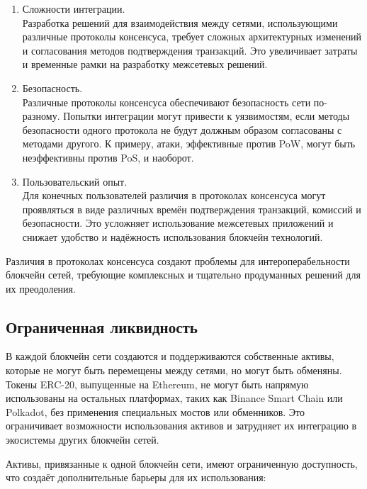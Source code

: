 \begin{enumerate}
	\item Сложности интеграции.\\
	Разработка решений для взаимодействия между сетями, использующими различные протоколы консенсуса, требует сложных архитектурных изменений и согласования методов подтверждения транзакций. Это увеличивает затраты и временные рамки на разработку межсетевых решений.

	\item Безопасность.\\
	Различные протоколы консенсуса обеспечивают безопасность сети по-разному. Попытки интеграции могут привести к уязвимостям, если методы безопасности одного протокола не будут должным образом согласованы с методами другого. К примеру, атаки, эффективные против PoW, могут быть неэффективны против PoS, и наоборот.

	\item Пользовательский опыт.\\
	Для конечных пользователей различия в протоколах консенсуса могут проявляться в виде различных времён подтверждения транзакций, комиссий и безопасности. Это усложняет использование межсетевых приложений и снижает удобство и надёжность использования блокчейн технологий.
\end{enumerate}

Различия в протоколах консенсуса создают проблемы для интероперабельности блокчейн сетей, требующие комплексных и тщательно продуманных решений для их преодоления.

\subsection{Ограниченная ликвидность}

В каждой блокчейн сети создаются и поддерживаются собственные активы, которые не могут быть перемещены между сетями, но могут быть обменяны. Токены ERC-20, выпущенные на Ethereum, не могут быть напрямую использованы на остальных платформах, таких как Binance Smart Chain или Polkadot, без применения специальных мостов или обменников. Это ограничивает возможности использования активов и затрудняет их интеграцию в экосистемы других блокчейн сетей.

Активы, привязанные к одной блокчейн сети, имеют ограниченную доступность, что создаёт дополнительные барьеры для их использования:

